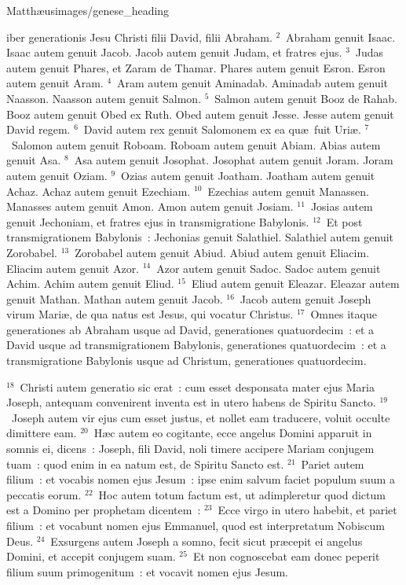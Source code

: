 {Matthæus}{images/genese_heading}


\bchapter
{}iber generationis Jesu Christi filii David, filii Abraham.
${}^{2}$~Abraham genuit Isaac. Isaac autem genuit Jacob. Jacob autem genuit Judam, et fratres ejus.
${}^{3}$~Judas autem genuit Phares, et Zaram de Thamar. Phares autem genuit Esron. Esron autem genuit Aram.
${}^{4}$~Aram autem genuit Aminadab. Aminadab autem genuit Naasson. Naasson autem genuit Salmon.
${}^{5}$~Salmon autem genuit Booz de Rahab. Booz autem genuit Obed ex Ruth. Obed autem genuit Jesse. Jesse autem genuit David regem.
${}^{6}$~David autem rex genuit Salomonem ex ea qu\ae\ fuit Uri\ae .
${}^{7}$~Salomon autem genuit Roboam. Roboam autem genuit Abiam. Abias autem genuit Asa.
${}^{8}$~Asa autem genuit Josophat. Josophat autem genuit Joram. Joram autem genuit Oziam.
${}^{9}$~Ozias autem genuit Joatham. Joatham autem genuit Achaz. Achaz autem genuit Ezechiam.
${}^{10}$~Ezechias autem genuit Manassen. Manasses autem genuit Amon. Amon autem genuit Josiam.
${}^{11}$~Josias autem genuit Jechoniam, et fratres ejus in transmigratione Babylonis.
${}^{12}$~Et post transmigrationem Babylonis~: Jechonias genuit Salathiel. Salathiel autem genuit Zorobabel.
${}^{13}$~Zorobabel autem genuit Abiud. Abiud autem genuit Eliacim. Eliacim autem genuit Azor.
${}^{14}$~Azor autem genuit Sadoc. Sadoc autem genuit Achim. Achim autem genuit Eliud.
${}^{15}$~Eliud autem genuit Eleazar. Eleazar autem genuit Mathan. Mathan autem genuit Jacob.
${}^{16}$~Jacob autem genuit Joseph virum Mari\ae , de qua natus est Jesus, qui vocatur Christus.
${}^{17}$~Omnes itaque generationes ab Abraham usque ad David, generationes quatuordecim~: et a David usque ad transmigrationem Babylonis, generationes quatuordecim~: et a transmigratione Babylonis usque ad Christum, generationes quatuordecim.


${}^{18}$~Christi autem generatio sic erat~: cum esset desponsata mater ejus Maria Joseph, antequam convenirent inventa est in utero habens de Spiritu Sancto.
${}^{19}$~Joseph autem vir ejus cum esset justus, et nollet eam traducere, voluit occulte dimittere eam.
${}^{20}$~H\ae c autem eo cogitante, ecce angelus Domini apparuit in somnis ei, dicens~: Joseph, fili David, noli timere accipere Mariam conjugem tuam~: quod enim in ea natum est, de Spiritu Sancto est.
${}^{21}$~Pariet autem filium~: et vocabis nomen ejus Jesum~: ipse enim salvum faciet populum suum a peccatis eorum.
${}^{22}$~Hoc autem totum factum est, ut adimpleretur quod dictum est a Domino per prophetam dicentem~:
${}^{23}$~Ecce virgo in utero habebit, et pariet filium~: et vocabunt nomen ejus Emmanuel, quod est interpretatum Nobiscum Deus.
${}^{24}$~Exsurgens autem Joseph a somno, fecit sicut pr\ae cepit ei angelus Domini, et accepit conjugem suam.
${}^{25}$~Et non cognoscebat eam donec peperit filium suum primogenitum~: et vocavit nomen ejus Jesum.

